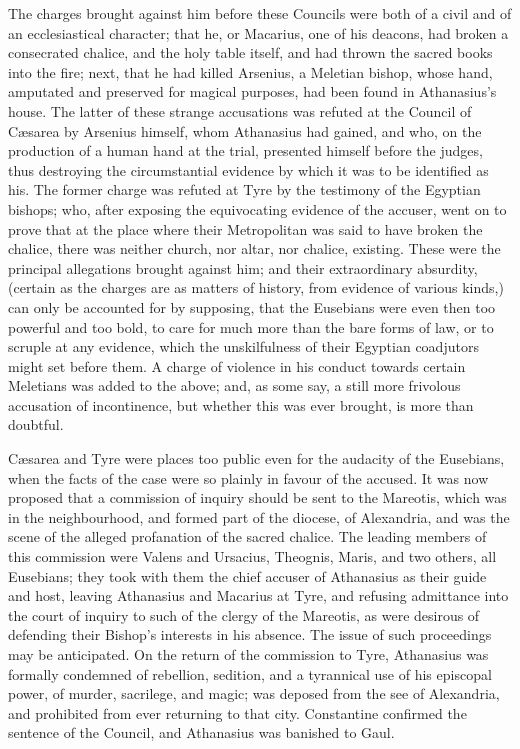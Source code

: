 The charges brought against him before these Councils were both of
a civil and of an ecclesiastical character; that he, or Macarius, one
of his deacons, had broken a consecrated chalice, and the holy table
itself, and had thrown the sacred books into the fire; next, that he
had killed Arsenius, a Meletian bishop, whose hand, amputated and
preserved for magical purposes, had been found in Athanasius's house.
The latter of these strange accusations was refuted at the Council of
Cæsarea by Arsenius himself, whom Athanasius had gained, and who, on
the production of a human hand at the trial, presented himself
before the judges, thus destroying the circumstantial evidence by
which it was to be identified as his. The former charge was refuted at
Tyre by the testimony of the Egyptian bishops; who, after exposing the
equivocating evidence of the accuser, went on to prove that at the
place where their Metropolitan was said to have broken the chalice,
there was neither church, nor altar, nor chalice, existing. These were
the principal allegations brought against him; and their extraordinary
absurdity, (certain as the charges are as matters of history, from
evidence of various kinds,) can only be accounted for by supposing,
that the Eusebians were even then too powerful and too bold, to care
for much more than the bare forms of law, or to scruple at any
evidence, which the unskilfulness of their Egyptian coadjutors might
set before them. A charge of violence in his conduct towards certain
Meletians was added to the above; and, as some say, a still more
frivolous accusation of incontinence, but whether this was ever
brought, is more than doubtful.

Cæsarea and Tyre were places too public even for the audacity of
the Eusebians, when the facts of the case were so plainly in favour of
the accused. It was now proposed that a commission of inquiry should
be sent to the Mareotis, which was in the neighbourhood, and formed
part of the diocese, of Alexandria, and was the scene of the alleged
profanation of the sacred chalice. The leading members of this
commission were Valens and Ursacius, Theognis, Maris, and two others,
all Eusebians; they took with them the chief accuser of Athanasius as
their guide and host, leaving Athanasius and Macarius at Tyre, and
refusing admittance into the court of inquiry to such of the
clergy of the Mareotis, as were desirous of defending their Bishop's
interests in his absence. The issue of such proceedings may be
anticipated. On the return of the commission to Tyre, Athanasius was
formally condemned of rebellion, sedition, and a tyrannical use of his
episcopal power, of murder, sacrilege, and magic; was deposed from the
see of Alexandria, and prohibited from ever returning to that city.
Constantine confirmed the sentence of the Council, and Athanasius was
banished to Gaul.

